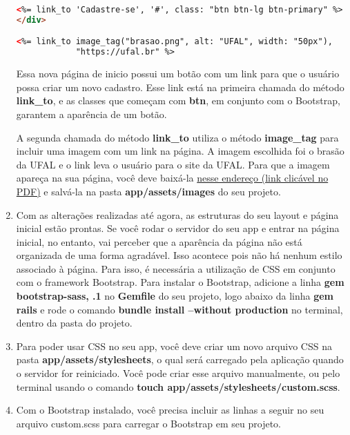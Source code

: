 \documentclass[a4paper,12pt]{article}
\begin{document}
\begin{enumerate}
\begin{lstlisting}[language=html, title={app/views/paginas\_estaticas/inicio.html.erb}]
<%= link_to 'Cadastre-se', '#', class: "btn btn-lg btn-primary" %>
</div>

<%= link_to image_tag("brasao.png", alt: "UFAL", width: "50px"),
            "https://ufal.br" %>
  \end{lstlisting}

  Essa nova página de inicio possui um botão com um link para que o usuário possa criar um novo cadastro. Esse link está na primeira chamada do método \textbf{link\_to}, e as classes que começam com \textbf{btn}, em conjunto com o Bootstrap, garantem a aparência de um botão.

  A segunda chamada do método \textbf{link\_to} utiliza o método \textbf{image\_tag} para incluir uma imagem com um link na página. A imagem escolhida foi o brasão da UFAL e o link leva o usuário para o site da UFAL. Para que a imagem apareça na sua página, você deve baixá-la \href{https://ufal.br/++theme++ufal.tema.tematico/++theme++ufal.tema.tematico/imgs/brasao.png}{nesse endereço (link clicável no PDF)} e salvá-la na pasta \textbf{app/assets/images} do seu projeto.

  \item Com as alterações realizadas até agora, as estruturas do seu layout e página inicial estão prontas. Se você rodar o servidor do seu app e entrar na página inicial, no entanto, vai perceber que a aparência da página não está organizada de uma forma agradável. Isso acontece pois não há nenhum estilo associado à página. Para isso, é necessária a utilização de CSS em conjunto com o framework Bootstrap. Para instalar o Bootstrap, adicione a linha \textbf{gem \textquotesingle bootstrap-sass\textquotesingle, .1\textquotesingle } no \textbf{Gemfile} do seu projeto, logo abaixo da linha \textbf{gem \textquotesingle rails\textquotesingle} e rode o comando \textbf{bundle install --without production} no terminal, dentro da pasta do projeto.

  \item Para poder usar CSS no seu app, você deve criar um novo arquivo CSS na pasta \textbf{app/assets/stylesheets}, o qual será carregado pela aplicação quando o servidor for reiniciado. Você pode criar esse arquivo manualmente, ou pelo terminal usando o comando \textbf{touch app/assets/stylesheets/custom.scss}.

  \item Com o Bootstrap instalado, você precisa incluir as linhas a seguir no seu arquivo custom.scss para carregar o Bootstrap em seu projeto.


\end{enumerate}
\end{document}
